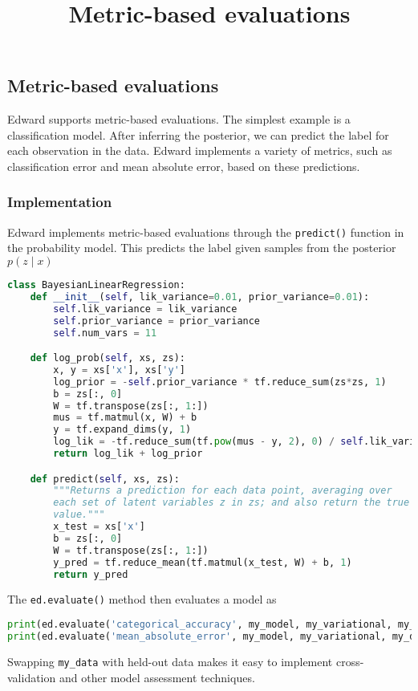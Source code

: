\title{Metric-based evaluations}

\subsection{Metric-based evaluations}

Edward supports metric-based evaluations. The simplest example is 
a classification model. After inferring the posterior, we can predict the
label for each observation in the data. Edward implements a
variety of metrics, such as classification error and mean absolute error, based
on these predictions.

\subsubsection{Implementation}

Edward implements metric-based evaluations through the 
\texttt{predict()} function in the probability model. This
predicts the label given samples from the posterior $p(z \mid x)$
\begin{lstlisting}[language=Python]
class BayesianLinearRegression:
    def __init__(self, lik_variance=0.01, prior_variance=0.01):
        self.lik_variance = lik_variance
        self.prior_variance = prior_variance
        self.num_vars = 11

    def log_prob(self, xs, zs):
        x, y = xs['x'], xs['y']
        log_prior = -self.prior_variance * tf.reduce_sum(zs*zs, 1)
        b = zs[:, 0]
        W = tf.transpose(zs[:, 1:])
        mus = tf.matmul(x, W) + b
        y = tf.expand_dims(y, 1)
        log_lik = -tf.reduce_sum(tf.pow(mus - y, 2), 0) / self.lik_variance
        return log_lik + log_prior

    def predict(self, xs, zs):
        """Returns a prediction for each data point, averaging over
        each set of latent variables z in zs; and also return the true
        value."""
        x_test = xs['x']
        b = zs[:, 0]
        W = tf.transpose(zs[:, 1:])
        y_pred = tf.reduce_mean(tf.matmul(x_test, W) + b, 1)
        return y_pred  
\end{lstlisting}

The \texttt{ed.evaluate()} method then evaluates a model as
\begin{lstlisting}[language=Python]
print(ed.evaluate('categorical_accuracy', my_model, my_variational, my_data))
print(ed.evaluate('mean_absolute_error', my_model, my_variational, my_data))
\end{lstlisting}
Swapping \texttt{my_data} with held-out data makes it easy to implement
cross-validation and other model assessment techniques.
